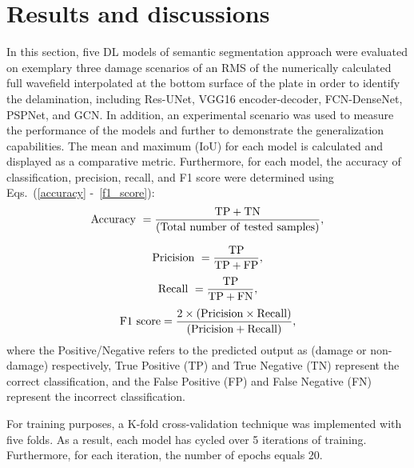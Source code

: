 \section{Results and discussions}
\label{section:results_and_discussions}
In this section, five DL models of semantic segmentation approach were evaluated on exemplary three damage scenarios of an RMS of the numerically calculated full wavefield interpolated at the bottom surface of the plate in order to identify the delamination, including Res-UNet, VGG16 encoder-decoder, FCN-DenseNet, PSPNet, and GCN.
In addition, an experimental scenario was used to measure the performance of the models and further to demonstrate the generalization capabilities.
The mean and maximum (IoU) for each model is calculated and displayed as a comparative metric.
Furthermore, for each model, the accuracy of classification, precision, recall, and F1 score were determined using Eqs.~(\ref{accuracy} -~\ref{f1_score}):
\begin{equation}
	\rm Accuracy\ = \frac{TP+TN}{(Total\ number\ of\ tested\ samples)},
	\label{accuracy}
\end{equation}

\begin{equation}
	\rm Pricision\ =\frac{TP}{TP+FP},
	\label{pricisoin}
\end{equation}
\begin{equation}
	\rm Recall\ = \frac{TP}{TP+ FN},
	\label{recall}
\end{equation}
\begin{equation}
	\rm F1\ score =\frac{2 \times (Pricision\times Recall)}{(Pricision + Recall)},
	\label{f1_score}
\end{equation}
where the Positive/Negative refers to the predicted output as (damage or non-damage) respectively, True Positive (TP) and True Negative (TN) represent the correct classification, and the False Positive (FP) and False Negative (FN) represent the incorrect classification.

For training purposes, a K-fold cross-validation technique was implemented with five folds.
As a result, each model has cycled over 5 iterations of training.
Furthermore, for each iteration, the number of epochs equals 20.
